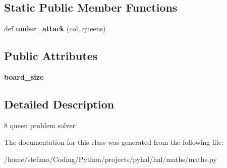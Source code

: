 \subsection*{Static Public Member Functions}
\begin{DoxyCompactItemize}
\item 
def {\bfseries under\+\_\+attack} (col, queens)\hypertarget{classhal_1_1maths_1_1maths_1_1_eight_queen_af5dc0defb59e9865853cf7d9f1337427}{}\label{classhal_1_1maths_1_1maths_1_1_eight_queen_af5dc0defb59e9865853cf7d9f1337427}

\end{DoxyCompactItemize}
\subsection*{Public Attributes}
\begin{DoxyCompactItemize}
\item 
{\bfseries board\+\_\+size}\hypertarget{classhal_1_1maths_1_1maths_1_1_eight_queen_a8d242fe77a100b25c6ab6e861069623b}{}\label{classhal_1_1maths_1_1maths_1_1_eight_queen_a8d242fe77a100b25c6ab6e861069623b}

\end{DoxyCompactItemize}


\subsection{Detailed Description}
\begin{DoxyVerb}8 queen problem solver \end{DoxyVerb}
 

The documentation for this class was generated from the following file\+:\begin{DoxyCompactItemize}
\item 
/home/stefano/\+Coding/\+Python/projects/pyhal/hal/maths/maths.\+py\end{DoxyCompactItemize}

